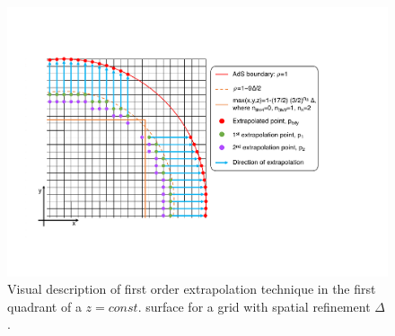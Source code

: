 \documentclass[a4paper,11pt]{article}
\numberwithin{equation}{section}
\begin{document}
\begin{figure}[t!]
        \centering
        \includegraphics[width=6.1in,clip=true]{plots/lego_circle/Lego_circle_new_noconvergence.pdf}
\parbox{5.0in}{\caption{Visual description of first order extrapolation technique in the first quadrant of a $z=const.$ surface for a grid with spatial refinement $\Delta$.
        }\label{fig:lego_circle}}
\end{figure}
\end{document}
